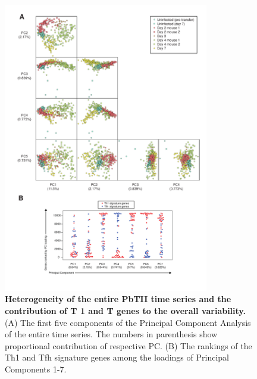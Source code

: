\begin{figure}
    \centering
    \includegraphics[width=0.8\textwidth]{"Fig S7 rev3"}
    \caption[Heterogeneity of the entire PbTII time series and the contribution of T 1 and T genes to the overall variability]{\textbf{Heterogeneity of the entire PbTII time series and the contribution of T 1 and T genes to the overall variability.} (A) The first five components of the Principal Component Analysis of the entire time series. The numbers in parenthesis show proportional contribution of respective PC. (B) The rankings of the Th1 and Tfh signature genes among the loadings of Principal Components 1-7.}
    \label{fig:ms7}
\end{figure}

